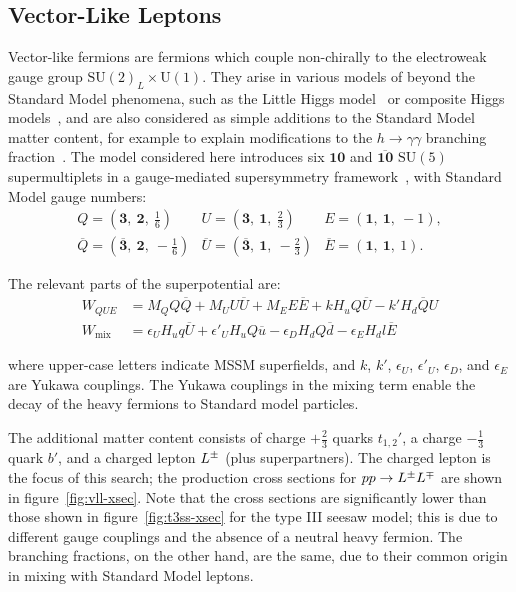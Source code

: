 \subsection{Vector-Like Leptons}
Vector-like fermions are fermions which couple non-chirally to the electroweak gauge group $\mathrm{SU}(2)_L\times \mathrm{U}(1)$. They arise in various models of beyond the Standard Model phenomena, such as the Little Higgs model~\cite{ArkaniHamed2001232} or composite Higgs models~\cite{PhysRevLett.81.2634}, and are also considered as simple additions to the Standard Model matter content, for example to explain modifications to the $h\rightarrow\gamma\gamma$ branching fraction~\cite{ArkaniHamed:2012kq}. The model considered here introduces six $\mathbf{10}$ and $\mathbf{\overline{10}}$ $\mathrm{SU}(5)$ supermultiplets in a gauge-mediated supersymmetry framework~\cite{Martin:2012dg}, with Standard Model gauge numbers:
\begin{equation}
  \begin{array}{ccc}
    Q=(\mathbf{3},\ \mathbf{2},\ \frac{1}{6}) & U=(\mathbf{3},\ \mathbf{1},\ \frac{2}{3}) & E=(\mathbf{1},\ \mathbf{1},\ -1), \\
    \overline{Q}=(\mathbf{\overline{3}},\ \mathbf{2},\ -\frac{1}{6}) & \overline{U}=(\mathbf{\overline{3}},\ \mathbf{1},\ -\frac{2}{3}) & \overline{E}=(\mathbf{1},\ \mathbf{1},\ 1).
  \end{array}
\end{equation}

The relevant parts of the superpotential are:
\begin{align}
  W_{QUE} &= M_Q Q \overline{Q}+M_UU\overline{U}+M_EE\overline{E}+kH_uQ\overline{U} - k'H_d\overline{Q}U \\
  W_{\mathrm{mix}} &= \epsilon_U H_u q \overline{U} + \epsilon'_{U} H_u Q \overline{u} - \epsilon_D H_d Q \overline{d} - \epsilon_E H_d l \overline{E}
\end{align}

where upper-case letters indicate MSSM superfields, and $k$, $k'$, $\epsilon_U$, $\epsilon'_U$, $\epsilon_D$, and $\epsilon_E$ are Yukawa couplings. The Yukawa couplings in the mixing term enable the decay of the heavy fermions to Standard model particles.

The additional matter content consists of charge $+\frac{2}{3}$ quarks $t_{1,2}'$, a charge $-\frac{1}{3}$ quark $b'$, and a charged lepton $L^{\pm}$ (plus superpartners). The charged lepton is the focus of this search; the production cross sections for $pp\rightarrow L^{\pm}L^{\mp}$ are shown in figure~\ref{fig:vll-xsec}. Note that the cross sections are significantly lower than those shown in figure~\ref{fig:t3ss-xsec} for the type III seesaw model; this is due to different gauge couplings and the absence of a neutral heavy fermion. The branching fractions, on the other hand, are the same, due to their common origin in mixing with Standard Model leptons. 

